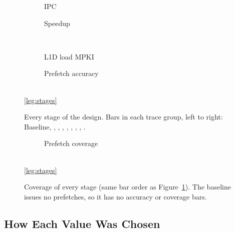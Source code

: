 \begin{figure}[H]
\centering
\begin{subfigure}{0.49\textwidth}\centering
  \caption{IPC}
\end{subfigure}\hfill
\begin{subfigure}{0.49\textwidth}\centering
  \caption{Speedup}
\end{subfigure}\\[4pt]
\begin{subfigure}{0.49\textwidth}\centering
  \caption{L1D load MPKI}
\end{subfigure}\hfill
\begin{subfigure}{0.49\textwidth}\centering
  \caption{Prefetch accuracy}
\end{subfigure}\\[3pt]
\ref*{leg:stages}
\caption{Every stage of the design. Bars in each trace group, left to right: Baseline, ,
, , , , , , .}
\label{fig:t1-stages}
\end{figure}

\begin{figure}[H]
\centering
\begin{subfigure}{0.49\textwidth}\centering
  \caption{Prefetch coverage}
\end{subfigure}\\[3pt]
\ref*{leg:stages}
\caption{Coverage of every stage (same bar order as Figure~\ref{fig:t1-stages}). The baseline issues no prefetches,
so it has no accuracy or coverage bars.}
\label{fig:t1-cov}
\end{figure}

\subsection{How Each Value Was Chosen}\label{sec:t1-values}

